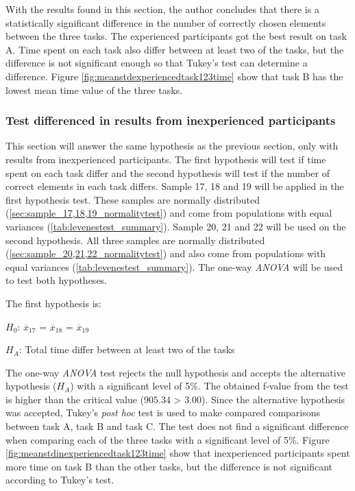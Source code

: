 \vspace{0.3cm}

With the results found in this section, the author concludes that there is a statistically significant difference in the number of correctly chosen elements between the three tasks. The experienced participants got the best result on task A. Time spent on each task also differ between at least two of the tasks, but the difference is not significant enough so that Tukey's test can determine a difference. Figure \ref{fig:meanstdexperiencedtask123time} show that task B has the lowest mean time value of the three tasks.  


\subsubsection[Sample 17 -  22]{Test differenced in results from inexperienced participants}\label{sec:sample_17_18_19_anova}

This section will answer the same hypothesis as the previous section, only with results from inexperienced participants. The first hypothesis will test if time spent on each task differ and the second hypothesis will test if the number of correct elements in each task differs. Sample 17, 18 and 19 will be applied in the first hypothesis test. These samples are normally distributed (\ref{sec:sample_17,18,19_normalitytest}) and come from populations with equal variances (\ref{tab:levenestest_summary}). Sample 20, 21 and 22 will be used on the second hypothesis. All three samples are normally distributed (\ref{sec:sample_20,21,22_normalitytest}) and also come from populations with equal variances (\ref{tab:levenestest_summary}). The one-way \textit{ANOVA} will be used to test both hypotheses. 

The first hypothesis is:\\
\centerline{$H_{0}$: $\overline{x}_{17}$ = $\overline{x}_{18}$ = $\overline{x}_{19}$}
\centerline{$H_{A}$: Total time differ between at least two of the tasks}
\vspace{0.2cm}

The one-way \textit{ANOVA} test rejects the null hypothesis and accepts the alternative hypothesis ($H_{A}$) with a significant level of 5\%. The obtained f-value from the test is higher than the critical value ($905.34$ > $3.00$). Since the alternative hypothesis was accepted, Tukey's \textit{post hoc} test is used to make compared comparisons between task A, task B and task C. The test does not find a significant difference when comparing each of the three tasks with a significant level of 5\%. Figure \ref{fig:meanstdinexperiencedtask123time} show that inexperienced participants spent more time on task B than the other tasks, but the difference is not significant according to Tukey's test.

